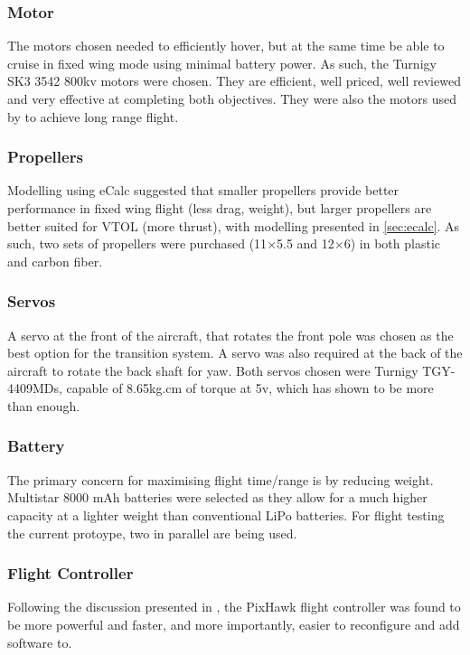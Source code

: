 \subsubsection*{Motor}
The motors chosen needed to efficiently hover, but at the same time be able to cruise in fixed wing mode using minimal battery power. As such, the Turnigy SK3 3542 800kv motors were chosen. They are efficient, well priced, well reviewed and very effective at completing both objectives. They were also the motors used by  to achieve long range flight.
	
\subsubsection*{Propellers}
Modelling using eCalc suggested that smaller propellers provide better performance in fixed wing flight (less drag, weight), but larger propellers are better suited for VTOL (more thrust), with modelling presented in \ref{sec:ecalc}. As such, two sets of propellers were purchased (11$\times$5.5 and 12$\times$6) in both plastic and carbon fiber.
	
\subsubsection*{Servos}
A servo at the front of the aircraft, that rotates the front pole was chosen as the best option for the transition system. A servo was also required at the back of the aircraft to rotate the back shaft for yaw. Both servos chosen were Turnigy TGY-4409MDs, capable of 8.65kg.cm of torque at 5v, which has shown to be more than enough. 
		
\subsubsection*{Battery}
The primary concern for maximising flight time/range is by reducing weight. Multistar 8000 mAh batteries were selected as they allow for a much higher capacity at a lighter weight than conventional LiPo batteries. For flight testing the current protoype, two in parallel are being used. 
	
\subsubsection*{Flight Controller}
Following the discussion presented in \cite{ref:controller_comparison}, the PixHawk flight controller was found to be more powerful and faster, and more importantly, easier to reconfigure and add software to.

